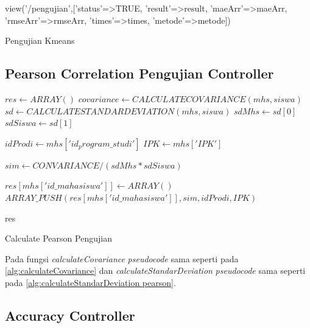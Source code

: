 \begin{algorithm}[H]
\begin{algorithmic}[1]
       \State \Return view('/pengujian',['status'=>TRUE, 'result'=>result, 'maeArr'=>maeArr, 'rmseArr'=>rmseArr, 'times'=>times, 'metode'=>metode])
    \EndProcedure
  \end{algorithmic} 
  \caption{Pengujian Kmeans}
  \label{alg:pengujianKmeans}
\end{algorithm}

\subsection{Pearson Correlation Pengujian Controller}
\label{subsec:pearson pengujian}

\begin{algorithm}[H]
  \begin{algorithmic}[1]
        \State $res \gets ARRAY()$
                \State $covariance \gets CALCULATECOVARIANCE(mhs, siswa)$
                \State $sd \gets CALCULATESTANDARDEVIATION(mhs,siswa)$
                \State $sdMhs \gets sd[0]$
                \State $sdSiswa \gets sd[1]$
                
                \State $idProdi \gets mhs['id_program\_studi']$
                \State $IPK \gets mhs['IPK']$
                
                \State $sim \gets CONVARIANCE / (sdMhs * sdSiswa)$
                
                    \State $res[mhs['id\_mahasiswa']] \gets ARRAY()$
                    \State $ARRAY\_PUSH(res[mhs['id\_mahasiswa']], sim, idProdi, IPK)$
                \EndIf
            \EndIf
        \EndFor
    
        \State \Return res
    \EndProcedure
  \end{algorithmic} 
  \caption{Calculate Pearson Pengujian}
  \label{alg:calculatePearsonPengujian}
\end{algorithm}

Pada fungsi \textit{calculateCovariance} \textit{pseudocode} sama seperti pada \ref{alg:calculateCovariance} dan \textit{calculateStandarDeviation} \textit{pseudocode} sama seperti pada \ref{alg:calculateStandarDeviation pearson}.

\subsection{Accuracy Controller}
\label{subsec:accuracy}

